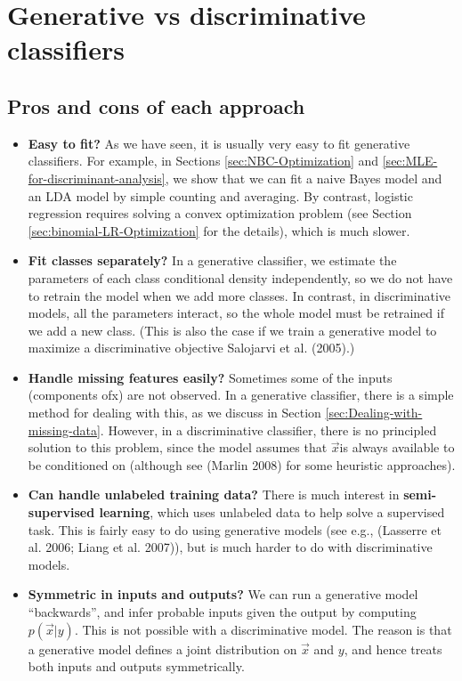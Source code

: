\section{Generative vs discriminative classifiers}


\subsection{Pros and cons of each approach}
\begin{itemize}
\item{\textbf{Easy to fit?} As we have seen, it is usually very easy to fit generative classifiers. For example, in Sections \ref{sec:NBC-Optimization} and \ref{sec:MLE-for-discriminant-analysis}, we show that we can fit a naive Bayes model and an LDA model by simple counting and averaging. By contrast, logistic regression requires solving a convex optimization problem (see Section \ref{sec:binomial-LR-Optimization} for the details), which is much slower.}

\item{\textbf{Fit classes separately?} In a generative classifier, we estimate the parameters of each class conditional density independently, so we do not have to retrain the model when we add more classes. In contrast, in discriminative models, all the parameters interact, so the whole model must be retrained if we add a new class. (This is also the case if we train a generative model to maximize a discriminative objective Salojarvi et al. (2005).)}

\item{\textbf{Handle missing features easily?} Sometimes some of the inputs (components ofx) are not observed. In a generative classifier, there is a simple method for dealing with this, as we discuss in Section \ref{sec:Dealing-with-missing-data}. However, in a discriminative classifier, there is no principled solution to this problem, since the model assumes that $\vec{x}$is always available to be conditioned on (although see (Marlin 2008) for some heuristic approaches).}

\item{\textbf{Can handle unlabeled training data?} There is much interest in \textbf{semi-supervised learning}, which uses unlabeled data to help solve a supervised task. This is fairly easy to do using generative models (see e.g., (Lasserre et al. 2006; Liang et al. 2007)), but is much harder to do with discriminative models.}

\item{\textbf{Symmetric in inputs and outputs?} We can run a generative model “backwards”, and infer probable inputs given the output by computing $p(\vec{x}|y)$. This is not possible with a discriminative model. The reason is that a generative model defines a joint distribution on $\vec{x}$ and $y$, and hence treats both inputs and outputs symmetrically.}


\end{itemize}
